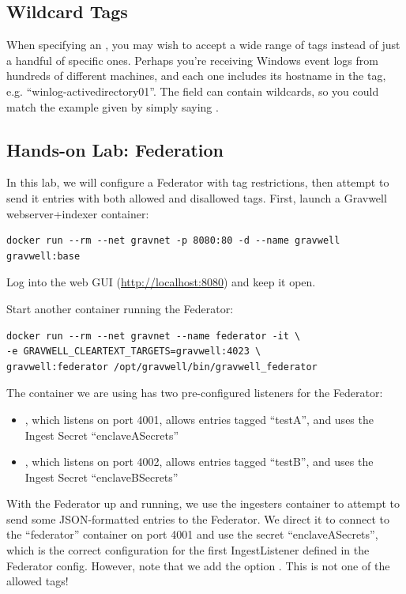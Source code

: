 \subsection{Wildcard Tags}

When specifying an , you may wish to accept a wide range of tags instead of just a handful of specific ones. Perhaps you're receiving Windows event logs from hundreds of different machines, and each one includes its hostname in the tag, e.g. ``winlog-activedirectory01''. The  field can contain wildcards, so you could match the example given by simply saying .

\subsection{Hands-on Lab: Federation}

In this lab, we will configure a Federator with tag restrictions, then
attempt to send it entries with both allowed and disallowed tags. First,
launch a Gravwell webserver+indexer container:

\begin{Verbatim}[breaklines=true]
docker run --rm --net gravnet -p 8080:80 -d --name gravwell gravwell:base
\end{Verbatim}

Log into the web GUI (\href{http://localhost:8080}{http://localhost:8080}) and keep it open.

Start another container running the Federator:

\begin{Verbatim}[breaklines=true]
docker run --rm --net gravnet --name federator -it \
-e GRAVWELL_CLEARTEXT_TARGETS=gravwell:4023 \
gravwell:federator /opt/gravwell/bin/gravwell_federator
\end{Verbatim}

The container we are using has two pre-configured listeners for the
Federator:

\begin{itemize}
\item
  , which listens on port 4001, allows entries tagged
  ``testA'', and uses the Ingest Secret ``enclaveASecrets''
\item
  \code{enclaveB}, which listens on port 4002, allows entries tagged
  ``testB'', and uses the Ingest Secret ``enclaveBSecrets''
\end{itemize}

With the Federator up and running, we use the ingesters container to attempt to send some JSON-formatted
entries to the Federator. We direct it to connect to the ``federator'' container on port 4001 and
use the secret ``enclaveASecrets'', which is the correct configuration
for the first IngestListener defined in the Federator config. However, note that we
add the option \code{-tag-name json}. This is not one of the allowed tags!


